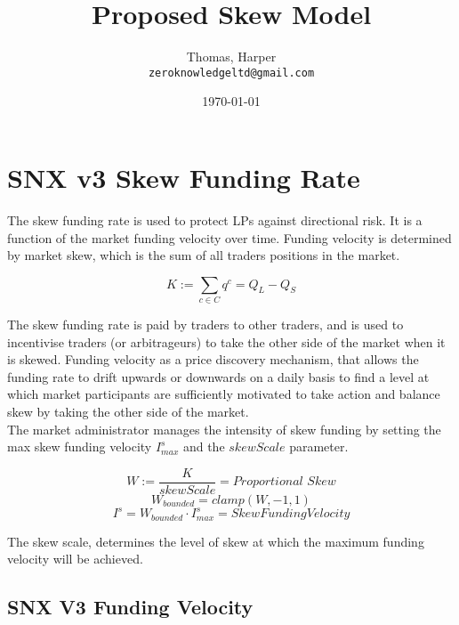 \documentclass[]{article}
\title{Proposed Skew Model}
\author{
  Thomas, Harper\\
  \texttt{zeroknowledgeltd@gmail.com}
}
\date{\today}
\begin{document}
\maketitle

\section{SNX v3 Skew Funding Rate}

The skew funding rate is used to protect LPs against directional risk. It is a function of the market funding velocity over time. Funding velocity is determined by market skew, which is the sum of all traders positions in the market.

\begin{equation}
K := \sum_{c \in C}{q^c} = Q_L - Q_S
\end{equation}

The skew funding rate is paid by traders to other traders, and is used to incentivise traders (or arbitrageurs) to take the other side of the market when it is skewed. Funding velocity as a price discovery mechanism, that allows the funding rate to drift upwards or downwards on a daily basis to find a level at which market participants are sufficiently motivated to take action and balance skew by taking the other side of the market.\\

The market administrator manages the intensity of skew funding by setting the max skew funding velocity $I^s_{max}$ and the $skewScale$ parameter.

\begin{equation}
W := \frac{K}{skewScale} = \textit{Proportional Skew}
\end{equation}
\begin{equation}
W_{\textit{bounded}} = clamp(W, -1, 1)
\end{equation}
\begin{equation}
I^s = W_{\textit{bounded}}\cdot I^s_{max} = Skew Funding Velocity
\end{equation}

The skew scale, determines the level of skew at which the maximum funding velocity will be achieved.

\subsection{SNX V3 Funding Velocity}

\end{document}
